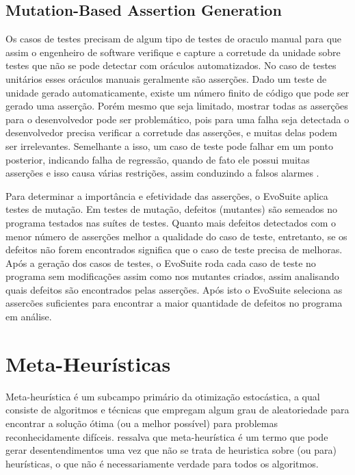 \documentclass[12pt,a4paper]{article}
\begin{document}
\subsection{Mutation-Based Assertion Generation}

Os casos de testes precisam de algum tipo de testes de oraculo manual para que assim o engenheiro de software verifique e capture a corretude da unidade sobre testes que não se pode detectar com oráculos automatizados. No caso de testes unitários esses oráculos manuais geralmente são asserções. Dado um teste de unidade gerado automaticamente, existe um número finito de código que pode ser gerado uma asserção. Porém mesmo que seja limitado, mostrar todas as asserções para o desenvolvedor pode ser problemático, pois para uma falha seja detectada o desenvolvedor precisa verificar a corretude das asserções, e muitas delas podem ser irrelevantes. Semelhante a isso, um caso de teste pode falhar em um ponto posterior, indicando falha de regressão, quando de fato ele possui muitas asserções e isso causa várias restrições, assim conduzindo a falsos alarmes \cite{fraser2011evosuite}.

Para determinar a importância e efetividade das asserções, o EvoSuite aplica testes de mutação. Em testes de mutação, defeitos (mutantes) são semeados no programa testados nas suítes de testes. Quanto mais defeitos detectados com o menor número de asserções melhor a qualidade do caso de teste, entretanto, se os defeitos não forem encontrados significa que o caso de teste precisa de melhoras. Após a geração dos casos de testes, o EvoSuite roda cada caso de teste no programa sem modificações assim como nos mutantes criados, assim analisando quais defeitos são encontrados pelas asserções. Após isto o EvoSuite seleciona as assercões suficientes para encontrar a maior quantidade de defeitos no programa em análise.


\newpage

\section{Meta-Heurísticas}
Meta-heurística é um subcampo primário da otimização estocástica, a qual consiste de algoritmos e técnicas que empregam algum grau de aleatoriedade para encontrar a solução ótima (ou a melhor possível) para problemas reconhecidamente difíceis. \citeauthor{luke2009essentials} \cite{luke2009essentials} ressalva que meta-heurística é um termo que pode gerar desentendimentos uma vez que não se trata de heuristica sobre (ou para) heurísticas, o que não é necessariamente verdade para todos os algoritmos. 
\end{document}
